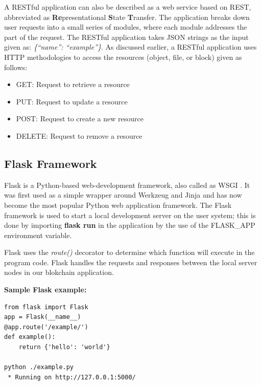 \documentclass[12pt]{article}
\begin{document}
A RESTful application can also be described as a web service based on REST, abbreviated as \textbf{Re}presentational \textbf{S}tate \textbf{T}ransfer. The application breaks down user requests into a small series of modules, where each module addresses the part of the request. The RESTful application takes JSON strings as the input given as: \emph{\{“name”: “example”\}}. As discussed earlier, a RESTful application uses HTTP methodologies to access the resources (object, file, or block) given as follows:
\begin{itemize}
    \item GET: Request to retrieve a resource
    \item PUT: Request to update a resource
    \item POST: Request to create a new resource
    \item DELETE: Request to remove a resource
\end{itemize}

\subsection{Flask Framework}
Flask is a Python-based web-development framework, also called as \ac{WSGI} \cite{FlaskDocumentation}. It was first used as a simple wrapper around Werkzeug and Jinja and has now become the most popular Python web application framework. The Flask framework is used to start a local development server on the user system; this is done by importing \textbf{flask run} in the application by the use of the FLASK\_APP environment variable.

Flask uses the \emph{route()} decorator to determine which function will execute in the program code. Flask handles the requests and responses between the local server nodes in our blokchain application.
 
\textbf{Sample Flask example:}
\begin{lstlisting}
from flask import Flask
app = Flask(__name__)
@app.route('/example/')
def example():
    return {'hello': 'world'}

python ./example.py
 * Running on http://127.0.0.1:5000/
\end{lstlisting}
\end{document}
